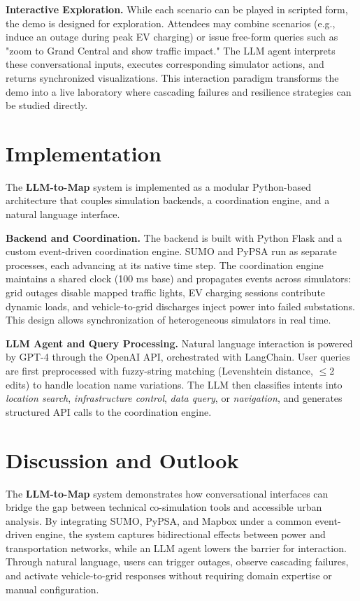 \documentclass[sigconf,review,nonacm]{acmart}
\begin{document}
\noindent\textbf{Interactive Exploration.}
While each scenario can be played in scripted form, the demo is designed for exploration. Attendees may combine scenarios (e.g., induce an outage during peak EV charging) or issue free-form queries such as "zoom to Grand Central and show traffic impact." The LLM agent interprets these conversational inputs, executes corresponding simulator actions, and returns synchronized visualizations. This interaction paradigm transforms the demo into a live laboratory where cascading failures and resilience strategies can be studied directly.



\section{Implementation}
The \textbf{LLM-to-Map} system is implemented as a modular Python-based architecture that couples simulation backends, a coordination engine, and a natural language interface.

\noindent\textbf{Backend and Coordination.}
The backend is built with Python Flask and a custom event-driven coordination engine. SUMO and PyPSA run as separate processes, each advancing at its native time step. The coordination engine maintains a shared clock (100 ms base) and propagates events across simulators: grid outages disable mapped traffic lights, EV charging sessions contribute dynamic loads, and vehicle-to-grid discharges inject power into failed substations. This design allows synchronization of heterogeneous simulators in real time.

\noindent\textbf{LLM Agent and Query Processing.}
Natural language interaction is powered by GPT-4 through the OpenAI API, orchestrated with LangChain. User queries are first preprocessed with fuzzy-string matching (Levenshtein distance, $\leq$2 edits) to handle location name variations. The LLM then classifies intents into \emph{location search}, \emph{infrastructure control}, \emph{data query}, or \emph{navigation}, and generates structured API calls to the coordination engine.

\section{Discussion and Outlook}
The \textbf{LLM-to-Map} system demonstrates how conversational interfaces can bridge the gap between technical co-simulation tools and accessible urban analysis. By integrating SUMO, PyPSA, and Mapbox under a common event-driven engine, the system captures bidirectional effects between power and transportation networks, while an LLM agent lowers the barrier for interaction. Through natural language, users can trigger outages, observe cascading failures, and activate vehicle-to-grid responses without requiring domain expertise or manual configuration.
\end{document}
